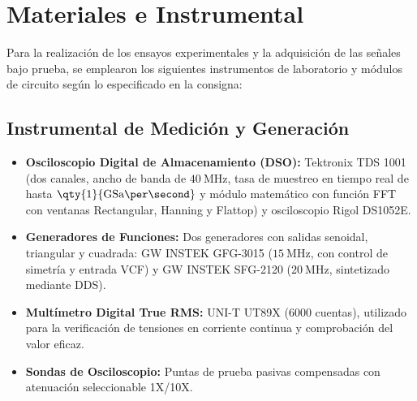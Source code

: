 \chapter{Materiales e Instrumental}

Para la realización de los ensayos experimentales y la adquisición de las señales bajo prueba, se emplearon los
siguientes instrumentos de laboratorio y módulos de circuito según lo especificado en la consigna:

\section{Instrumental de Medición y Generación}
\begin{itemize}
    \item \textbf{Osciloscopio Digital de Almacenamiento (DSO):} Tektronix TDS 1001 (dos canales, ancho de banda de
    $\qty{40}{\mega\hertz}$, tasa de muestreo en tiempo real de hasta $\qty{1}{\text{GSa\per\second}}$ y módulo
    matemático con función FFT con ventanas Rectangular, Hanning y Flattop) y osciloscopio Rigol DS1052E.
    \item \textbf{Generadores de Funciones:} Dos generadores con salidas senoidal, triangular y cuadrada:
    GW INSTEK GFG-3015 ($\qty{15}{\mega\hertz}$, con control de simetría y entrada VCF) y GW INSTEK SFG-2120
    ($\qty{20}{\mega\hertz}$, sintetizado mediante DDS).
    \item \textbf{Multímetro Digital True RMS:} UNI-T UT89X (6000 cuentas), utilizado para la verificación de
    tensiones en corriente continua y comprobación del valor eficaz.
    \item \textbf{Sondas de Osciloscopio:} Puntas de prueba pasivas compensadas con atenuación seleccionable 1X/10X.
\end{itemize}

